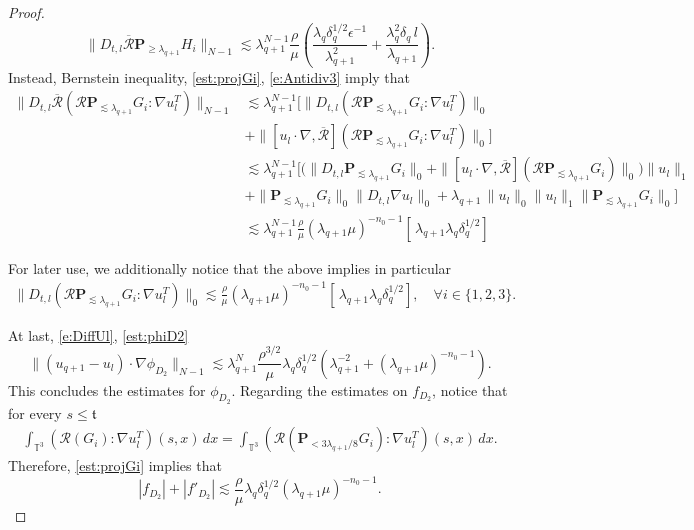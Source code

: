 \documentclass[10pt,a4paper]{amsart}
\numberwithin{equation}{section}
\numberwithin{corollario}{section}
\numberwithin{lemma}{section}
\numberwithin{prop}{section}
\theoremstyle{definition}
\theoremstyle{remark}
\newcommand{\T}{\mathbb{T}}
\newcommand{\proj}{\mathbf{P}}
\newcommand{\qq}{_{q+1}}
\begin{document}
\begin{proof}
\begin{equation}
    \|D_{t,l}\overline{\mathcal{R}}\proj_{\geq \lambda\qq}H_i\|_{N-1}\lesssim \lambda^{N-1}\qq\frac{\rho}{\mu}\left(\frac{\lambda_q\delta_q^{1/2}\epsilon^{-1}}{\lambda\qq^2}+\frac{\lambda_q^2\delta_q\,l}{\lambda\qq}\right).
\end{equation}
Instead, Bernstein inequality, \eqref{est:projGi}, \eqref{e:Antidiv3} imply that
    \begin{align} \label{est:DtphiD2fifth}
        \|D_{t,l}\overline{\mathcal{R}}(\mathcal{R}\proj_{\lesssim\lambda\qq}G_i:\nabla u_l^T)\|_{N-1}
        &\lesssim 
        \lambda\qq^{N-1}\big[\|D_{t,l}(\mathcal{R}\proj_{\lesssim\lambda\qq}G_i:\nabla u_l^T)\|_0
        \\
        &+
        \|[u_l\cdot \nabla, \overline{\mathcal{R}}](\mathcal{R}\proj_{\lesssim\lambda\qq}G_i:\nabla u_l^T)\|_0\big]\\
        &\lesssim\lambda\qq^{N-1}\Big[\big(\|D_{t,l}\proj_{\lesssim\lambda\qq}G_i\|_0+\|[u_l\cdot \nabla,\overline{\mathcal{R}}](\mathcal{R}\proj_{\lesssim\lambda\qq}G_i)\|_0\big)\|u_l\|_1\\
        &+\|\proj_{\lesssim\lambda\qq}G_i\|_0\|D_{t,l}\nabla u_l\|_0+\lambda\qq \,\|u_l\|_0\|u_l\|_1\|\proj_{\lesssim\lambda\qq}G_i\|_0\Big]\\
        &\lesssim\lambda\qq^{N-1}\frac{\rho}{\mu}(\lambda\qq\mu)^{-n_0-1}\left[\,\lambda\qq\lambda_q\delta_q^{1/2}\right]
    \end{align}

For later use, we additionally notice that the above implies in particular
\begin{align} \label{eq:auxiliary.E''}
    \|D_{t,l}(\mathcal{R}\proj_{\lesssim\lambda\qq}G_i:\nabla u_l^T)\|_0
    \lesssim
    \frac{\rho}{\mu}(\lambda\qq\mu)^{-n_0-1}\left[\,\lambda\qq\lambda_q\delta_q^{1/2}\right],
    \quad
    \forall i \in \{1,2,3\}.
\end{align}
    
At last, \eqref{e:DiffUl}, \eqref{est:phiD2}
\begin{equation}\label{est:DtphiD2sixth}
    \|(u\qq-u_l)\cdot\nabla \phi_{D_2}\|_{N-1}\lesssim\lambda\qq^N\frac{\rho^{3/2}}{\mu}\lambda_q\delta_q^{1/2}(\lambda\qq^{-2}+(\lambda\qq\mu)^{-n_0-1}).
\end{equation}
This concludes the estimates for $\phi_{D_2}$. Regarding the estimates on $f_{D_2}$, notice that for every $s \leq \mathfrak{t}$
\begin{align}
    \int_{\T^3}\left(\mathcal{R}(G_i):\nabla u_l^T\right)(s,x)\,dx=\int_{\T^3}\left(\mathcal{R}(\proj_{<3\lambda\qq/8} G_i):\nabla u_l^T\right)(s,x)\,dx.
\end{align}
Therefore, \eqref{est:projGi} implies that
\begin{equation}
   |f_{D_2}|+|f'_{D_2}|\lesssim \frac{\rho}{\mu}\lambda_q\delta_q^{1/2}(\lambda\qq\mu)^{-n_0-1}. 
\end{equation}

\end{proof}
\end{document}
